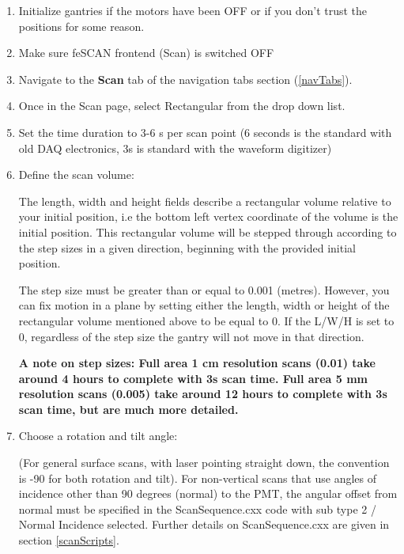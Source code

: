 \documentclass[twoside,letterpaper]{refart}
\begin{document}
\begin{enumerate}
	
	\item Initialize gantries if the motors have been OFF or if you don't trust the positions for some reason.
	
	\item Make sure feSCAN frontend (Scan) is switched OFF
	
	\item Navigate to the \textbf{Scan} tab of the navigation tabs section (\ref{navTabs}).	
	
	\item Once in the Scan page, select Rectangular from the drop down list.
	
	\item Set the time duration to 3-6 s per scan point (6 seconds is the standard with old DAQ electronics, 3s is standard with the waveform digitizer)
	
	\item Define the scan volume: 
			
			The length, width and height fields describe a rectangular volume relative to your initial position, i.e the bottom left vertex coordinate of the volume is the initial position. This rectangular volume will be stepped  through according to the step sizes in a given direction, beginning with the provided initial position.
			
			The step size must be greater than or equal to 0.001 (metres).  However, you can fix motion in a plane by setting either the length, width or height of the rectangular volume mentioned above to be equal to 0. If the L/W/H is set to 0, regardless of the step size the gantry will not move in that direction.
			
			\textbf{A note on step sizes:
				Full area 1 cm resolution scans (0.01) take around 4 hours to complete with 3s scan time. 
				Full area 5 mm resolution scans (0.005) take around 12 hours to complete with 3s scan time, but are much more detailed.}
				
	\item Choose a rotation and tilt angle:
	
			(For general surface scans, with laser pointing straight down, the convention is -90 for both rotation and tilt).  For non-vertical scans that use angles of incidence other than 90 degrees (normal) to the PMT, the angular offset from normal must be specified in the ScanSequence.cxx code with sub type 2 / Normal Incidence selected. Further details on ScanSequence.cxx are given in section \ref{scanScripts}. 
	

\end{enumerate}
\end{document}
